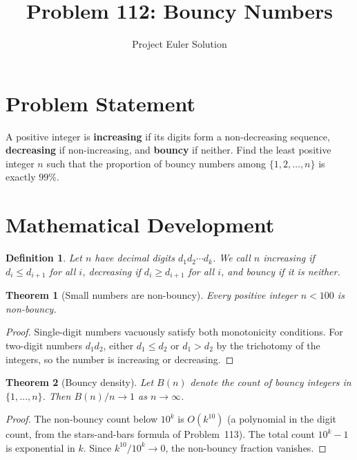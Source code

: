 \documentclass[12pt]{article}
\title{Problem 112: Bouncy Numbers}
\author{Project Euler Solution}
\date{}
\newtheorem{theorem}{Theorem}
\newtheorem{definition}{Definition}
\begin{document}
\maketitle

\section{Problem Statement}

A positive integer is \textbf{increasing} if its digits form a non-decreasing sequence, \textbf{decreasing} if non-increasing, and \textbf{bouncy} if neither. Find the least positive integer $n$ such that the proportion of bouncy numbers among $\{1,2,\ldots,n\}$ is exactly $99\%$.

\section{Mathematical Development}

\begin{definition}
Let $n$ have decimal digits $d_1 d_2 \cdots d_k$. We call $n$ \emph{increasing} if $d_i \le d_{i+1}$ for all $i$, \emph{decreasing} if $d_i \ge d_{i+1}$ for all $i$, and \emph{bouncy} if it is neither.
\end{definition}

\begin{theorem}[Small numbers are non-bouncy]
Every positive integer $n < 100$ is non-bouncy.
\end{theorem}

\begin{proof}
Single-digit numbers vacuously satisfy both monotonicity conditions. For two-digit numbers $d_1 d_2$, either $d_1 \le d_2$ or $d_1 > d_2$ by the trichotomy of the integers, so the number is increasing or decreasing.
\end{proof}

\begin{theorem}[Bouncy density]
Let $B(n)$ denote the count of bouncy integers in $\{1,\ldots,n\}$. Then $B(n)/n \to 1$ as $n \to \infty$.
\end{theorem}

\begin{proof}
The non-bouncy count below $10^k$ is $O(k^{10})$ (a polynomial in the digit count, from the stars-and-bars formula of Problem~113). The total count $10^k - 1$ is exponential in $k$. Since $k^{10}/10^k \to 0$, the non-bouncy fraction vanishes.
\end{proof}
\end{document}
